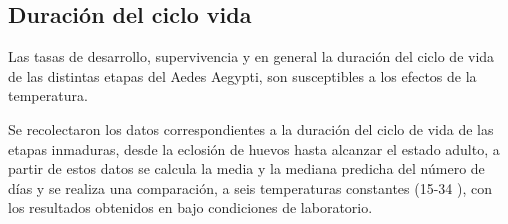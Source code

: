 
\subsection{Duración del ciclo vida}
Las tasas de desarrollo, supervivencia y en general la duración del ciclo de vida de las distintas
etapas del Aedes Aegypti, son susceptibles a los efectos de la temperatura. 

Se recolectaron los datos correspondientes a la duración del ciclo de vida de las etapas inmaduras, desde
la eclosión de huevos  hasta alcanzar el estado adulto, a partir de estos datos se calcula la media y la
mediana predicha del número de días y se realiza una comparación, a seis temperaturas constantes 
(15-34 \textcelsius), con los resultados obtenidos en  \cite{rueda1990temperature} bajo condiciones de
laboratorio.

